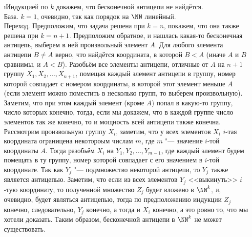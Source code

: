 \i Индукцией по $k$ докажем, что бесконечной антицепи не найдётся.\\
База. $k=1$, очевидно, так как порядок на $\NN$ линейный.\\
Переход. Предположим, что задача решена при $k = n$, покажем, что она также решена при $k = n+1$.
Предположим обратное, и нашлась какая-то бесконечная антицепь, выберем в ней произвольный элемент $A$. Для любого элемента антицепи $B \ne A$ верно, что найдётся координата, в которой $B < A$ (иначе $A$ и $B$ сравнимы, и $A < B$). Разобьём все элементы антицепи, отличные от $A$ на $n+1$ группу $X_1, X_2, \ldots, X_{n+1}$, помещая каждый элемент антицепи в группу, номер которой совпадает с номером координаты, в которой этот элемент меньше $A$ (если элемент можно поместить в несколько групп, то выберем произвольную). Заметим, что при этом каждый элемент (кроме $A$) попал в какую-то группу, число которых конечно, тогда, если мы докажем, что в каждой группе число элементов так же конечно, то и мощность всей антицепи также конечна.\\
Рассмотрим произвольную группу $X_i$, заметим, что у всех элементов $X_i$ $i$-тая координата ограницена некотороым числам $m$, где $m$ "--- значение $i$-той координаты $A$. Тогда разобьём $X_i$ на $Y_1, Y_2, \ldots, Y_{m-1}$, где каждый элемент будем помещать в ту группу, номер которой совпадает с его значением в $i$-той координате.
Так как $Y_j$ "--- подмножество некоторой антицепи, то $Y_j$ также является антицепью. Заметим, что если из всех элементов $Y_j$ <<выкинуть>> $i$-тую координату, то полученной множество $Z_j$ будет вложено в $\NN^k$, и, очевидно, будет являться антицепью, тогда по предположению индукции $Z_j$ конечно, следовательно, $Y_j$ конечно, а тогда и $X_i$ конечно, а это ровно то, что мы хотели доказать. Таким образом, бесконечной антицепи в $\NN^k$ не может существовать.